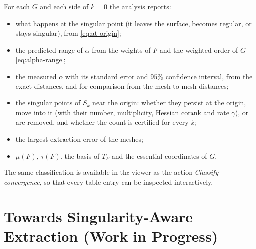 For each $G$ and each side of $k=0$ the analysis reports:
\begin{itemize}
    \item what happens at the singular point (it leaves the surface, becomes
          regular, or stays singular), from \eqref{eq:at-origin};
    \item the predicted range of $\alpha$ from the weights of $F$ and the
          weighted order of $G$ \eqref{eq:alpha-range};
    \item the measured $\alpha$ with its standard error and $95\%$ confidence
          interval, from the exact distances, and for comparison from the
          mesh-to-mesh distances;
    \item the singular points of $S_k$ near the origin: whether they persist
          at the origin, move into it (with their number, multiplicity, Hessian
          corank and rate $\gamma$), or are removed, and whether the count is
          certified for every $k$;
    \item the largest extraction error of the meshes;
    \item $\mu(F)$, $\tau(F)$, the basis of $T_F$ and the essential coordinates
          of $G$.
\end{itemize}
The same classification is available in the viewer as the action
\emph{Classify convergence}, so that every table entry can be inspected
interactively.

\section{Towards Singularity-Aware Extraction (Work in Progress)}
\label{sec:method-singularity-aware}

\begin{center}
\end{center}

